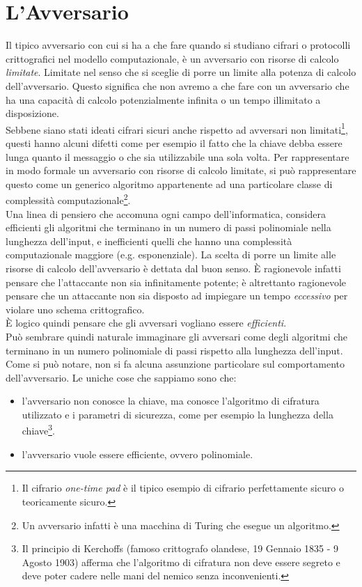 \documentclass[a4paper,openright,twoside,12pt]{report}
\begin{document}
\section{L'Avversario}
Il tipico avversario con cui si ha a che fare quando si studiano cifrari o protocolli crittografici nel modello computazionale,
è un avversario con risorse di calcolo \emph{limitate}. Limitate nel senso che si sceglie di porre un limite alla potenza di calcolo dell'avversario.
Questo significa che non avremo a che fare con un avversario che ha una capacit\`a di calcolo potenzialmente infinita o un tempo illimitato a disposizione.\\
Sebbene siano stati ideati cifrari sicuri anche rispetto ad avversari non limitati\footnote{Il cifrario \emph{one-time pad} \`e il tipico esempio di cifrario perfettamente sicuro o teoricamente sicuro.}, questi hanno alcuni difetti come per esempio
il fatto che la chiave debba essere lunga quanto il messaggio o che sia utilizzabile una sola volta.
Per rappresentare in modo formale un avversario con risorse di calcolo limitate, si pu\`o rappresentare questo come un generico algoritmo appartenente ad una 
particolare classe di complessit\`a computazionale\footnote{Un avversario infatti \`e una macchina di Turing che esegue un algoritmo.}. \\
Una linea di pensiero che accomuna ogni campo dell'informatica, considera efficienti gli algoritmi che terminano in un numero di passi polinomiale nella lunghezza dell'input, e inefficienti 
quelli che hanno una complessit\`a computazionale maggiore (e.g. esponenziale). 
La scelta di porre un limite alle risorse di calcolo dell'avversario \`e dettata dal buon senso.
\`E ragionevole infatti pensare che l'attaccante non sia infinitamente potente; \`e altrettanto ragionevole pensare che un attaccante non sia disposto ad impiegare un tempo \emph{eccessivo} per violare uno schema crittografico.\\
\`E logico quindi pensare che gli avversari vogliano essere \emph{efficienti}.\\
Pu\`o sembrare quindi naturale immaginare gli avversari come degli algoritmi che terminano in un numero polinomiale di passi
rispetto alla lunghezza dell'input. Come si pu\`o notare, non si fa alcuna assunzione particolare sul comportamento dell'avversario. Le uniche cose che sappiamo sono che:
\begin{itemize}
 \item l'avversario non conosce la chiave, ma conosce l'algoritmo di cifratura utilizzato  e i parametri di sicurezza, come per esempio la lunghezza della chiave\footnote{Il principio di Kerchoffs 
(famoso crittografo olandese, 19 Gennaio 1835 - 9 Agosto 1903) afferma che
l'algoritmo di cifratura non deve essere segreto e deve poter cadere nelle mani del nemico senza inconvenienti.}. 
 \item l'avversario vuole essere efficiente, ovvero polinomiale.
\end{itemize}
\end{document}

